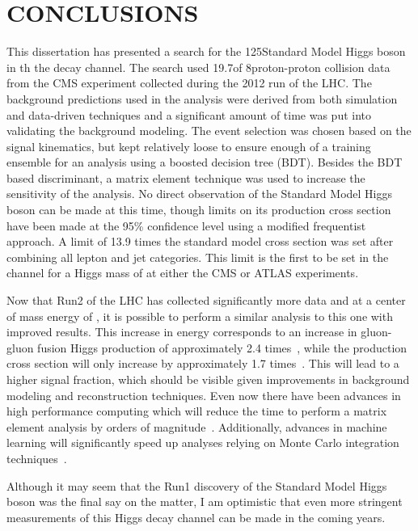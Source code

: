 %
%
%



\chapter{\texorpdfstring{\uppercase {Conclusions}}{Conclusions}}
\label{ch:conclusion}

This dissertation has presented a search for the 125\gev Standard Model Higgs boson in th the \HWWlvjj decay channel.
The search used 19.7\fbinv of 8\tev proton-proton collision data from the CMS experiment collected during the 2012 run of the LHC.
The background predictions used in the analysis were derived from both simulation and data-driven techniques and a significant amount of time was put into validating the background modeling.
The event selection was chosen based on the signal kinematics, but kept relatively loose to ensure enough of a training ensemble for an analysis using a boosted decision tree (BDT).
Besides the BDT based discriminant, a matrix element technique was used to increase the sensitivity of the analysis.
No direct observation of the Standard Model Higgs boson can be made at this time, though limits on its production cross section have been made at the 95\% confidence level using a modified frequentist approach.
A limit of 13.9 times the standard model cross section was set after combining all lepton and jet categories.
This limit is the first to be set in the \HWWlvjj channel for a Higgs mass of \joinsym{\MH}{=}{125\gev} at either the CMS or ATLAS experiments.

Now that Run2 of the LHC has collected significantly more data and at a center of mass energy of \CM{13\tev}, it is possible to perform a similar analysis to this one with improved results.
This increase in energy corresponds to an increase in gluon-gluon fusion Higgs production of approximately 2.4 times~\cite{Baglio:2015wcg}, while the \Wjets production cross section will only increase by approximately 1.7 times~\cite{SMCrossSectionsat13TeV}.
This will lead to a higher signal fraction, which should be visible given improvements in background modeling and reconstruction techniques.
Even now there have been advances in high performance computing which will reduce the time to perform a matrix element analysis by orders of magnitude~\cite{1742-6596-664-9-092009}.
Additionally, advances in machine learning will significantly speed up analyses relying on Monte Carlo integration techniques~\cite{Bendavid:2017zhk}.

Although it may seem that the Run1 discovery of the Standard Model Higgs boson was the final say on the matter, I am optimistic that even more stringent measurements of this Higgs decay channel can be made in the coming years.